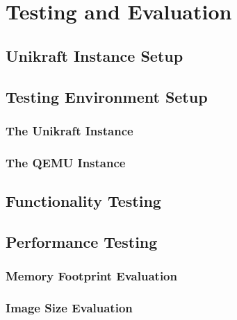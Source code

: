 \chapter{Testing and Evaluation}
\label{chapter:testing-evaluation}

\section{Unikraft Instance Setup}
\label{sec:unikraft-instance-setup}

\section{Testing Environment Setup}
\label{sec:testing-environment-setup}

\subsection{The Unikraft Instance}
\label{subsec:testing-environment-setup}

\subsection{The QEMU Instance}
\label{subsec:qemu-instance}


\section{Functionality Testing}
\label{sec:functionality-testing}


\section{Performance Testing}
\label{sec:performance-testing}

\subsection{Memory Footprint Evaluation}
\label{subsec:memory-footprint-evaluation}

\subsection{Image Size Evaluation}
\label{subsec:image-size-evaluation}

